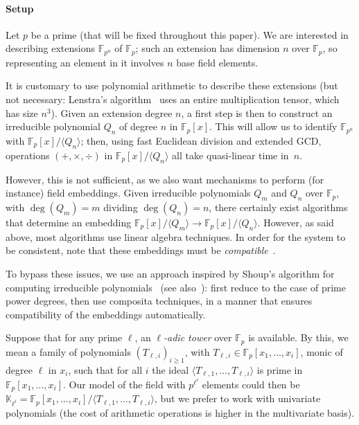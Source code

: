 \documentclass{sig-alternate}
\def\F {\ensuremath{\mathbb{F}}}
\def\K {\ensuremath{\mathbb{K}}}
\newcounter{algo}
\newcommand{\ang}[1]{\langle#1\rangle}
\begin{document}
\paragraph*{{\bf \rm Setup}}
Let $p$ be a prime (that will be fixed throughout this paper). We are
interested in describing extensions $\F_{p^n}$ of $\F_p$; such an
extension has dimension $n$ over $\F_p$, so representing an element in
it involves $n$ base field elements.

It is customary to use polynomial arithmetic to describe these
extensions (but not necessary: Lenstra's algorithm~\cite{LenstraJr91}
uses an entire multiplication tensor, which has size $n^3$). Given an
extension degree $n$, a first step is then to construct an irreducible
polynomial $Q_n$ of degree $n$ in $\F_p[x]$. This will allow us to
identify $\F_{p^n}$ with $\F_p[x]/\ang{Q_n}$; then, using fast
Euclidean division and extended GCD, operations $(+,\times,\div)$ in
$\F_p[x]/\ang{Q_n}$ all take quasi-linear time in~$n$.

However, this is not sufficient, as we also want mechanisms to perform
(for instance) field embeddings. Given irreducible polynomials $Q_m$
and $Q_n$ over $\F_p$, with $\deg(Q_m)=m$ dividing $\deg(Q_n)=n$,
there certainly exist algorithms that determine an embedding
$\F_p[x]/\ang{Q_m} \to \F_p[x]/\ang{Q_n}$. However, as said above,
most algorithms use linear algebra techniques. In order for the system
to be consistent, note that these embeddings must be {\em
  compatible}~\cite{bosma+cannon+steel97}.

To bypass these issues, we use an approach inspired by Shoup's
algorithm for computing irreducible polynomials~\cite{Shoup90,shoup94}
(see also~\cite{couveignes+lercier11,lenstra+desmit08-stdmodels}):
first reduce to the case of prime power degrees, then use composita
techniques, in a manner that ensures compatibility of the embeddings
automatically.

\smallskip{}
Suppose that for any prime $\ell$, an {\em $\ell$-adic tower} over
$\F_p$ is available. By this, we mean a family of polynomials
$(T_{\ell,i})_{i \ge 1}$, with $T_{\ell,i} \in \F_p[x_1,\dots,x_i]$,
monic of degree $\ell$ in $x_i$, such that for all $i$ the ideal
$\ang{T_{\ell,1},\dots,T_{\ell,i}}$ is prime in $\F_p[x_1,\dots,x_i]$.
Our model of the field with $p^{\ell^i}$ elements could then
be
$\K_{\ell^i}=\F_p[x_1,\dots,x_i]/\ang{T_{\ell,1},\dots,T_{\ell,i}}$,
but we prefer to work with univariate polynomials (the cost of
arithmetic operations is higher in the multivariate basis).  
\end{document}
